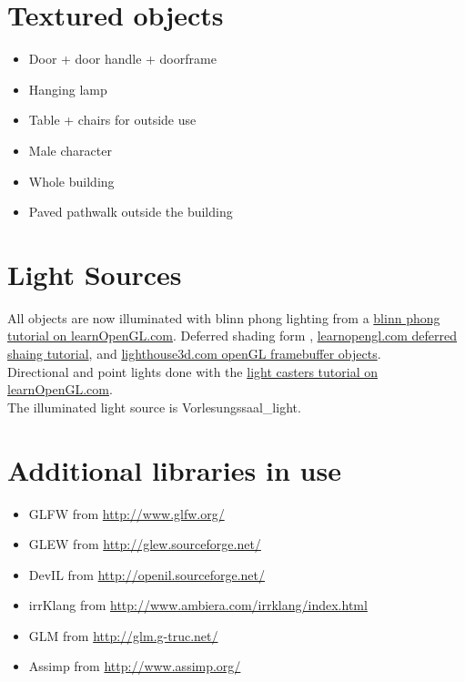 \documentclass[12pt]{article}
\begin{document}

\section{Textured objects \label{Texture Mapping}}
\begin{itemize}
\item Door + door handle + doorframe
\item Hanging lamp
\item Table + chairs for outside use
\item Male character
\item Whole building
\item Paved pathwalk outside the building
\end{itemize}

\section{Light Sources \label{lightSources}}
All objects are now illuminated with blinn phong lighting from a \href{http://learnopengl.com/#!Advanced-Lighting/Advanced-Lighting}{blinn phong tutorial on learnOpenGL.com}. Deferred shading form \cite{openGLSuperBible}, \href{http://learnopengl.com/#!Advanced-Lighting/Deferred-Shading}{learnopengl.com deferred shaing tutorial}, and \href{http://www.lighthouse3d.com/tutorials/opengl_framebuffer_objects/}{lighthouse3d.com openGL framebuffer objects}.\\

Directional and point lights done with the \href{http://learnopengl.com/#!Lighting/Light-casters}{light casters tutorial on learnOpenGL.com}.\\


The illuminated light source is Vorlesungssaal\_light.

\section{Additional libraries in use}

\begin{itemize}
\item GLFW from \url{http://www.glfw.org/}
\item GLEW from \url{http://glew.sourceforge.net/}
\item DevIL from \url{http://openil.sourceforge.net/}
\item irrKlang from \url{http://www.ambiera.com/irrklang/index.html}
\item GLM from \url{http://glm.g-truc.net/}
\item Assimp from \url{http://www.assimp.org/}
\end{itemize}
\end{document}
